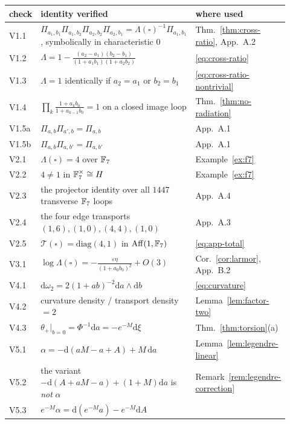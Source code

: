 \begin{center}\small
\renewcommand{\arraystretch}{1.18}
\begin{tabular}{@{}p{0.075\linewidth}p{0.565\linewidth}p{0.285\linewidth}@{}}
\toprule
check & identity verified & where used \\
\midrule
V1.1 & $\Pi_{a_1,b_1}\Pi_{a_1,b_2}\Pi_{a_2,b_2}\Pi_{a_2,b_1}
=\Lambda(\square)^{-1}\Pi_{a_1,b_1}$, symbolically in characteristic $0$
& Thm.~\ref{thm:cross-ratio}, App.~A.2 \\
V1.2 & $\Lambda=1-\frac{(a_2-a_1)(b_2-b_1)}{(1+a_1b_1)(1+a_2b_2)}$
& \eqref{eq:cross-ratio} \\
V1.3 & $\Lambda=1$ identically if $a_2=a_1$ or $b_2=b_1$
& \eqref{eq:cross-ratio-nontrivial} \\
V1.4 & $\prod_k\frac{1+a_kb_0}{1+a_{k-1}b_0}=1$ on a closed image loop
& Thm.~\ref{thm:no-radiation} \\
V1.5a & $\Pi_{a,b}\Pi_{a',b}=\Pi_{a,b}$ & App.~A.1 \\
V1.5b & $\Pi_{a,b}\Pi_{a,b'}=\Pi_{a,b'}$ & App.~A.1 \\
V2.1 & $\Lambda(\square)=4$ over $\mathbb{F}_7$ & Example~\ref{ex:f7} \\
V2.2 & $4\ne1$ in $\mathbb{F}_7^{\times}\cong H$ & Example~\ref{ex:f7} \\
V2.3 & the projector identity over all $1447$ transverse $\mathbb{F}_7$ loops
& App.~A.4 \\
V2.4 & the four edge transports $(1,6),(1,0),(4,4),(1,0)$
& App.~A.3 \\
V2.5 & $\mathcal T(\square)=\mathrm{diag}(4,1)$ in $\operatorname{Aff}(1,\mathbb{F}_7)$
& \eqref{eq:app-total} \\
V3.1 & $\log\Lambda(\square)=-\frac{\varepsilon\eta}{(1+a_0b_0)^{2}}+O(3)$
& Cor.~\ref{cor:larmor}, App.~B.2 \\
V4.1 & $\mathrm d\omega_2=2(1+ab)^{-2}\mathrm da\wedge\mathrm db$
& \eqref{eq:curvature} \\
V4.2 & curvature density $/$ transport density $=2$ & Lemma~\ref{lem:factor-two} \\
V4.3 & $\theta_+\big|_{b=0}=\Phi^{-1}\mathrm da=-e^{-M}\mathrm d\xi$
& Thm.~\ref{thm:torsion}(a) \\
V5.1 & $\alpha=-\mathrm d(aM-a+A)+M\,\mathrm da$
& Lemma~\ref{lem:legendre-linear} \\
V5.2 & the variant $-\mathrm d(A+aM-a)+(1+M)\mathrm da$ is \emph{not} $\alpha$
& Remark~\ref{rem:legendre-correction} \\
V5.3 & $e^{-M}\alpha=\mathrm d(e^{-M}a)-e^{-M}\mathrm dA$

\end{tabular}
\end{center}
